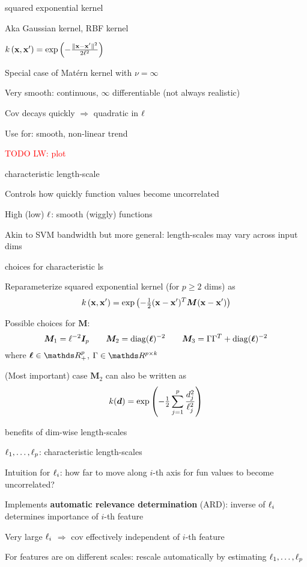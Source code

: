\documentclass[11pt,compress,t,notes=noshow, xcolor=table]{beamer}
\begin{document}
\begin{framei}{squared exponential kernel}
\item Aka Gaussian kernel, RBF kernel
\item $k\left(\mathbf{x}, \mathbf{x}^{\prime} \right) = \exp \left(-\frac{\| \mathbf{x} - \mathbf{x}^\prime \|^2}{2\ell^2} \right)$
\item Special case of Matérn kernel with $\nu = \infty$
\item Very smooth: continuous, $\infty$ differentiable (not always realistic)
\item Cov decays quickly $\Rightarrow$ quadratic in $\ell$
\item Use for: smooth, non-linear trend
\item \textcolor{red}{TODO LW: plot}
\end{framei}

\begin{framei}[sep=L]{characteristic length-scale}
\item Controls how quickly function values become uncorrelated
\item High (low) $\ell$: smooth (wiggly) functions
\vfill
{}
\item Akin to SVM bandwidth but more general: length-scales may vary across input dims
\end{framei}

\begin{framei}[sep=L]{choices for characteristic ls}
\item Reparameterize squared exponential kernel (for $p \geq 2$ dims) as
$$
k\left(\mathbf{x}, \mathbf{x}^{\prime} \right) = \exp \left(- \tfrac{1}{2}(\mathbf{x} - \mathbf{x}^\prime)^T\bm{M} (\mathbf{x} - \mathbf{x}^\prime )\right)
$$
\item Possible choices for $\bm{M}$:
$$
\bm{M}_1 = \ell^{-2}\bm{I}_p \qquad \bm{M}_2 = \operatorname{diag}(\bm{\ell})^{-2} \qquad \bm{M}_3 = \Gamma \Gamma^T + \operatorname{diag}(\bm{\ell})^{-2}
$$
where $\bm{\ls} \in \R^p_+$, $\Gamma \in \R^{p \times k}$ 
\item (Most important) case $\bm{M}_2$ can also be written as
$$
  k(\bm{d}) = \exp \left(- \tfrac{1}{2} \sum\limits_{j=1}^p \frac{d_j^2}{\ell_j^2} \right)
$$
\end{framei}

\begin{framei}[sep=L]{benefits of dim-wise length-scales}
\item $\ell_1,\dots, \ell_p$: characteristic length-scales
\item Intuition for $\ell_i$: how far to move along $i$-th axis for fun values to become uncorrelated?
\item Implements \textbf{automatic relevance determination} (ARD): inverse of $\ell_i$ determines importance of $i$-th feature
\item Very large $\ell_i$ $\Rightarrow$ cov effectively independent of $i$-th feature
\item For features are on different scales: rescale automatically by estimating $\ell_1,\dots, \ell_p$ 
\end{framei}
\end{document}

